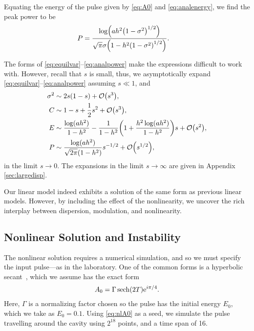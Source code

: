 \documentclass[9pt,twocolumn,twoside]{osajnl}
\let\originalleft\left
\let\originalright\right
\renewcommand{\left}{\mathopen{}\mathclose\bgroup\originalleft}
\renewcommand{\right}{\aftergroup\egroup\originalright}
\providecommand{\bigO}[1]{\ensuremath{\mathop{}\mathopen{}\mathcal{O}\mathopen{}\left(#1\right)}} %
\DeclareMathOperator{\sech}{sech}
\begin{document}
Equating the energy of the pulse given by \eqref{eq:A0} and \eqref{eq:analenergy}, we find the peak power to be
\begin{align}
	P &= \frac{\log \left( a h^2 \left( 1 - \sigma^2 \right)^{1/2} \right)}{\sqrt{\pi} \sigma \left( 1 - h^2 \left( 1 - \sigma^2 \right)^{1/2} \right)}.
	\label{eq:analpower}
\end{align}

The forms of \eqref{eq:equilvar}--\eqref{eq:analpower} make the expressions difficult to work with. However, recall that $s$ is small, thus, we asymptotically expand \eqref{eq:equilvar}--\eqref{eq:analpower} assuming $s \ll 1$, and
\begin{align}
	\sigma^2 &\sim 2s(1 - s) + \bigO{s^3}, \\
	C &\sim 1 - s + \frac{1}{2}s^2 + \bigO{s^3}, \\
	E &\sim \frac{\log (a h^2)}{1 - h^2} - \frac{1}{1 - h^2} \left( 1 + \frac{h^2 \log(a h^2)}{1 - h^2}  \right) s + \bigO{s^2}, \label{eq:maxenergy} \\
	P &\sim \frac{\log(ah^2)}{\sqrt{2 \pi}(1 - h^2)} s^{-1/2} + \bigO{s^{1/2}},
\end{align}
in the limit $s \rightarrow 0$. The expansions in the limit $s \rightarrow \infty$ are given in Appendix \ref{sec:largedisp}.

Our linear model indeed exhibits a solution of the same form as previous linear models. However, by including the effect of the nonlinearity, we uncover the rich interplay between dispersion, modulation, and nonlinearity.

\subsection{Nonlinear Solution and Instability}
\label{sec:nlresults}
The nonlinear solution requires a numerical simulation, and so we must specify the input pulse---as in the laboratory. One of the common forms is a hyperbolic secant~\cite{coen1997, finot2008, rothenberg1989b, tomlinson1984}, which we assume has the exact form
\begin{align}
	A_0 = \Gamma \sech \left( 2 T \right) \textrm{e}^{i \pi / 4}.
	\label{eq:nlA0}
\end{align}
Here, $\Gamma$ is a normalizing factor chosen so the pulse has the initial energy $E_0$, which we take as $E_0 = 0.1$. Using \eqref{eq:nlA0} as a seed, we simulate the pulse travelling around the cavity using $2^{18}$ points, and a time span of 16.
\end{document}
